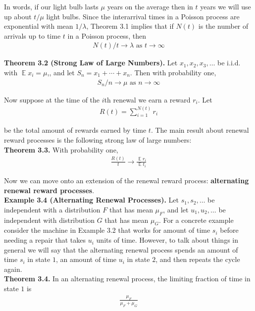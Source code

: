 \documentclass[12pt]{article}
\DeclareMathOperator*{\E}{\mathbb{E}}
\begin{document}
In words, if our light bulb lasts $\mu$ years on the average then in $t$ years we will use up about $t/\mu$ light bulbs. Since the interarrival times in a Poisson process are exponential with mean $1/\lambda$, Theorem 3.1 implies that if $N(t)$ is the number of arrivals up to time $t$ in a Poisson process, then
\begin{align*}
N(t)/t \to \lambda \text{ as } t \to \infty
\end{align*}

\textbf{Theorem 3.2 (Strong Law of Large Numbers).} Let $x_1, x_2, x_3, \ldots$ be i.i.d. with $\E x_i = \mu$,, and let $S_n = x_1 + \cdots + x_n$. Then with probability one,
\begin{align*}
S_n/n \to \mu \text{ as } n \to \infty
\end{align*}

Now suppose at the time of the $i$th renewal we earn a reward $r_i$. Let
\begin{align*}
R(t) = \sum_{i=1}^{N(t)} r_i
\end{align*}

be the total amount of rewards earned by time $t$. The main result about renewal reward processes is the following strong law of large numbers:\\

\textbf{Theorem 3.3.} With probability one,
\begin{align*}
\frac{R(t)}{t} \to \frac{\E r_i}{\E t_i}
\end{align*}

Now we can move onto an extension of the renewal reward process: \textbf{alternating renewal reward processes}.\\

\textbf{Example 3.4 (Alternating Renewal Processes).} Let $s_1, s_2, \ldots$ be independent with a distribution $F$ that has mean $\mu_F$, and let $u_1, u_2, \ldots$ be independent with distribution $G$ that has mean $\mu_G$. For a concrete example consider the machine in Example 3.2 that works for amount of time $s_i$ before needing a repair that takes $u_i$ units of time. However, to talk about things in general we will say that the alternating renewal process spends an amount of time $s_i$ in state $1$, an amount of time $u_i$ in state $2$, and then repeats the cycle again.\\

\textbf{Theorem 3.4.} In an alternating renewal process, the limiting fraction of time in state $1$ is
\begin{align*}
\frac{\mu_F}{\mu_F + \mu_G}
\end{align*}
\end{document}
